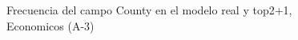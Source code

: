 \begin{figure}[H]
    \centering
    
    \caption{Frecuencia del campo County en el modelo real y top2+1, Economicos (A-3)}
    \label{frecuency-County-top2+1}
\end{figure}